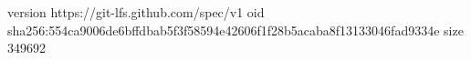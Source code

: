 version https://git-lfs.github.com/spec/v1
oid sha256:554ca9006de6bffdbab5f3f58594e42606f1f28b5acaba8f13133046fad9334e
size 349692

